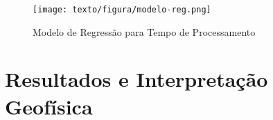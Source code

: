     \begin{figure}[H]
        \caption{Modelo de Regressão para Tempo de Processamento}
            \begin{center}
                \texttt{[image: texto/figura/modelo-reg.png]}
            \end{center}
        \legend{\Fonte{\oautor}}
        \label{modelo-reg}
    \end{figure}
    
    \section{Resultados e Interpretação Geofísica}
        
        
